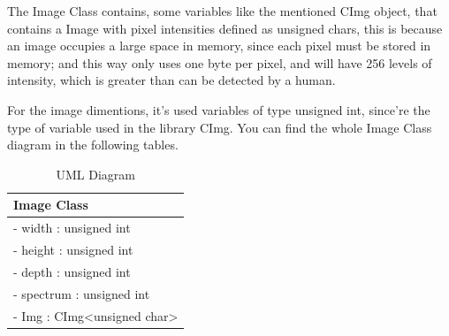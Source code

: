 \documentclass[a4paper]{article}
\begin{document}
    The Image Class contains, some variables like the mentioned CImg object, that contains a Image with pixel intensities defined as unsigned chars, this is because an image occupies a large space in memory, since each pixel must be stored in memory; and this way only uses one byte per pixel, and will have 256 levels of intensity, which is greater than can be detected by a human.
    
    For the image dimentions, it's used variables of type unsigned int, since're the type of variable used in the library CImg. 
    You can find the whole Image Class diagram in the following tables.
    
\begin{table}[H]
	\label{UML}
    \caption{UML Diagram}
	\centering
    
	\begin{tabular}[15cm]{ 
    >{\arraybackslash}m{15cm}}
        \toprule 

		\large{Image Class} \\   

		\midrule
		
       	- width : unsigned int\\
        - height : unsigned int \\
        - depth : unsigned int\\
        - spectrum : unsigned int \\
        - Img : CImg<unsigned char> \\


\end{tabular}
\end{table}
\end{document}
